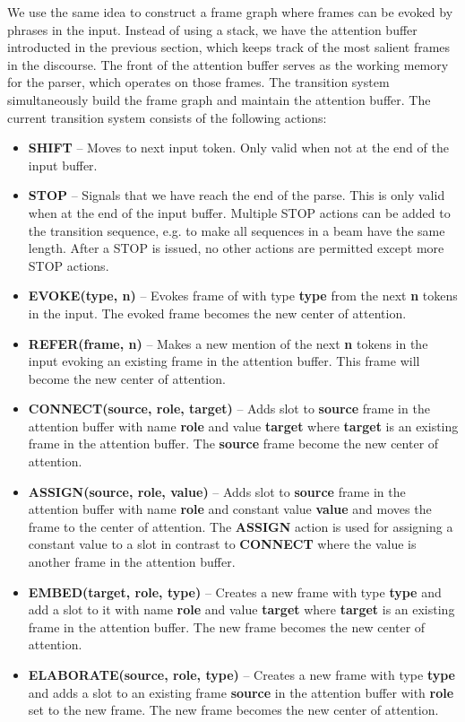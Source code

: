 \documentclass[11pt,a4paper]{article}
\begin{document}
We use the same idea to construct a frame graph where frames can be
evoked by phrases in the input. Instead of using a stack, we have the attention buffer introducted
in the previous section, which keeps track of the most salient frames in the
discourse. The front of the attention buffer serves as the working memory for
the parser, which operates on those frames. The transition system simultaneously
build the frame graph and maintain the attention buffer.
The current transition system consists of the following actions:

\begin{itemize}
  \item {\bf SHIFT} -- Moves to next input token. Only valid when not at the
        end of the input buffer.
  \item {\bf STOP} -- Signals that we have reach the end of the parse. This is
        only valid when at the end of the input buffer. Multiple STOP actions
        can be added to the transition sequence, e.g. to make all sequences in a
        beam have the same length. After a STOP is issued, no other actions are
        permitted except more STOP actions.
  \item {\bf EVOKE(type, n)} -- Evokes frame of with type {\bf type} from
        the next {\bf n} tokens in the input. The evoked frame becomes the new
        center of attention.
  \item {\bf REFER(frame, n)} -- Makes a new mention of the next {\bf n} tokens
        in the input evoking an existing frame in the attention buffer. This
        frame will become the new center of attention.
  \item {\bf CONNECT(source, role, target)} -- Adds slot to {\bf source} frame
        in the attention buffer with name {\bf role} and value {\bf target}
        where {\bf target} is an existing frame in the attention buffer. The
        {\bf source} frame become the new center of attention.
  \item {\bf ASSIGN(source, role, value)} -- Adds slot to {\bf source} frame in
        the attention buffer with name {\bf role} and constant value {\bf value}
        and moves the frame to the center of attention. The {\bf ASSIGN} action
        is used for assigning a constant value to a slot in contrast to
        {\bf CONNECT} where the value is another frame in the attention buffer.
  \item {\bf EMBED(target, role, type)} -- Creates a new frame with
        type {\bf type} and add a slot to it with name {\bf role} and value
        {\bf target} where {\bf target} is an existing frame in the attention
        buffer. The new frame becomes the new center of attention.
  \item {\bf ELABORATE(source, role, type)} -- Creates a new frame with type
        {\bf type} and adds a slot to an existing frame {\bf source} in the
        attention buffer with {\bf role} set to the new frame. The new frame
        becomes the new center of attention.
\end{itemize}
\end{document}
